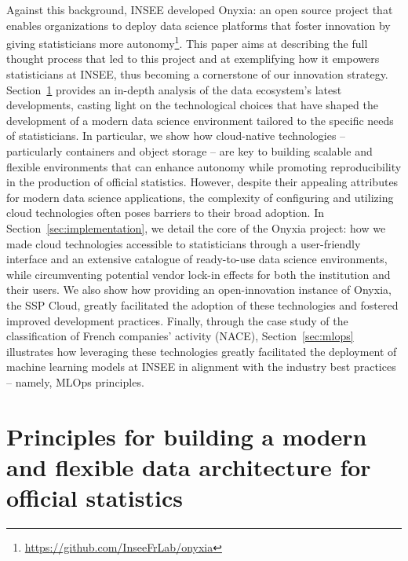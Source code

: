 \documentclass[graybox]{svmult}
\begin{document}
Against this background, INSEE developed Onyxia: an open source project that enables organizations to deploy data science platforms that foster innovation by giving statisticians more autonomy\footnote{\url{https://github.com/InseeFrLab/onyxia}}. This paper aims at describing the full thought process that led to this project and at exemplifying how it empowers statisticians at INSEE, thus becoming a cornerstone of our innovation strategy. Section~\ref{sec:principles} provides an in-depth analysis of the data ecosystem's latest developments, casting light on the technological choices that have shaped the development of a modern data science environment tailored to the specific needs of statisticians. In particular, we show how cloud-native technologies -- particularly containers and object storage -- are key to building scalable and flexible environments that can enhance autonomy while promoting reproducibility in the production of official statistics. However, despite their appealing attributes for modern data science applications, the complexity of configuring and utilizing cloud technologies often poses barriers to their broad adoption. In Section~\ref{sec:implementation}, we detail the core of the Onyxia project: how we made cloud technologies accessible to statisticians through a user-friendly interface and an extensive catalogue of ready-to-use data science environments, while circumventing potential vendor lock-in effects for both the institution and their users. We also show how providing an open-innovation instance of Onyxia, the SSP Cloud, greatly facilitated the adoption of these technologies and fostered improved development practices. Finally, through the case study of the classification of French companies' activity (NACE), Section~\ref{sec:mlops} illustrates how leveraging these technologies greatly facilitated the deployment of machine learning models at INSEE in alignment with the industry best practices -- namely, MLOps principles.




\section{Principles for building a modern and flexible data architecture for official statistics}
\label{sec:principles}
\end{document}
